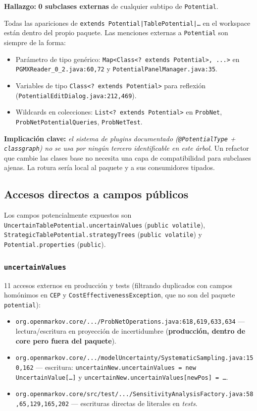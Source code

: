 \documentclass[11pt,a4paper]{article}
\newcommand{\code}[1]{\texttt{#1}}
\newcommand{\bad}[1]{\textcolor{codered}{\textbf{#1}}}
\newcommand{\good}[1]{\textcolor{codegreen}{\textbf{#1}}}
\begin{document}
\textbf{Hallazgo:} \bad{0 subclases externas} de cualquier subtipo de
\code{Potential}.

Todas las apariciones de \code{extends Potential|TablePotential|\dots} en el
workspace están dentro del propio paquete. Las menciones externas a
\code{Potential} son siempre de la forma:

\begin{itemize}[leftmargin=*]
  \item Parámetro de tipo genérico:
        \code{Map<Class<? extends Potential>, ...>}
        en \code{PGMXReader\_0\_2.java:60,72} y
        \code{PotentialPanelManager.java:35}.
  \item Variables de tipo \code{Class<? extends Potential>} para reflexión
        (\code{PotentialEditDialog.java:212,469}).
  \item Wildcards en colecciones: \code{List<? extends Potential>} en
        \code{ProbNet}, \code{ProbNetPotentialQueries},
        \code{ProbNetTest}.
\end{itemize}

\good{Implicación clave:} \emph{el sistema de plugins documentado
(\code{@PotentialType} + \code{classgraph}) no se usa por ningún tercero
identificable en este árbol}. Un refactor que cambie las clases base no
necesita una capa de compatibilidad para subclases ajenas. La rotura sería
local al paquete y a sus consumidores tipados.

\subsection{Accesos directos a campos públicos}\label{sub:fields}

Los campos potencialmente expuestos son \code{Uncertain\-Table\-Potential.uncertainValues}
(\code{public volatile}), \code{StrategicTablePotential.strategyTrees}
(\code{public volatile}) y \code{Potential.properties} (\code{public}).

\subsubsection*{\code{uncertainValues}}

11 accesos externos en producción y tests (filtrando duplicados con campos
homónimos en \code{CEP} y \code{CostEffectivenessException}, que no son del
paquete \code{potential}):

\begin{itemize}[leftmargin=*,itemsep=2pt]
  \item \code{org.openmarkov.core/.../ProbNetOperations.java:618,619,633,634}
        --- lectura/escritura en proyección de incertidumbre
        (\bad{producción, dentro de core pero fuera del paquete}).
  \item \code{org.openmarkov.core/.../modelUncertainty/SystematicSampling.java:150,162}
        --- escritura: \code{uncertainNew.uncertainValues = new UncertainValue[\dots]}
        y \code{uncertainNew.uncertainValues[newPos] = \dots}.
  \item \code{org.openmarkov.core/src/test/.../SensitivityAnalysisFactory.java:58,65,129,165,202}
        --- escrituras directas de literales en \emph{tests}.
\end{itemize}
\end{document}
